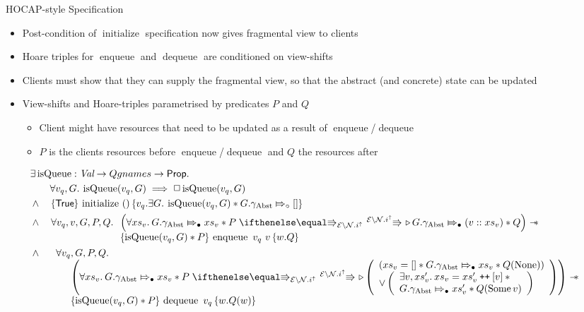 \documentclass[9pt]{beamer}
\newcommand{\initialise}{\operatorname{initialize}}
\newcommand{\enqueue}{\operatorname{enqueue}}
\newcommand{\dequeue}{\operatorname{dequeue}}
\newcommand{\isqueue}{\operatorname{isQueue}}
\newcommand{\Qgnames}{Qgnames}
\newcommand{\vq}{v_q}
\newcommand{\nodeval}{\valB}
\newcommand{\absvalue}{\val}
\newcommand{\absvalueList}{xs_v}
\newcommand{\Qg}{G}
\newcommand{\gabst}{\gname_{\mathrm{Abst}}}
\newcommand\catenate{\mathbin{\text{\ttfamily\upshape ++}}}
\newcommand{\Nl}{\ensuremath{\mathcal{N}}}
\newcommand{\abstractstatefullfrag}[2]{#1 \Mapsto_{\circ} #2}
\newcommand{\abstractstateauth}[2]{#1 \Mapsto_{\bullet} #2}
\newcommand{\hocapspecinitHTGen}[2]{\hoare{\TRUE}{\initialise \ \TT}{#1 . \Exists #2 . \isqueue(#1, #2) \star{} \abstractstatefullfrag{#2.\gabst}{[]}}}
\newcommand{\hocapspecinitGen}[2]{\hocapspecinitHTGen{#1}{#2}}
\newcommand{\hocapspecinit}{\hocapspecinitGen{\vq}{\Qg}}
\newcommand{\hocapspecenqVS}[5]{\abstractstateauth{#2.\gabst}{#5} \star{} #3 \vs[\mask\setminus\Nl.i^\uparrow] \later \abstractstateauth{#2.\gabst}{(#1 :: #5)} \star{} #4}
\newcommand{\hocapspecenqHT}[5]{\hoare{\isqueue(#1, #3) \star{} #4}{\enqueue \ #1 \ #2}{\valB . #5}}
\newcommand{\hocapspecenqGen}[6]{\All #1, #2, #3, #4, #5.
\begin{array}[t]{l}
\left(\All #6 . \hocapspecenqVS{#2}{#3}{#4}{#5}{#6} \right)
\wand\\
\hocapspecenqHT{#1}{#2}{#3}{#4}{#5}
\end{array}}
\newcommand{\hocapspecenq}{\hocapspecenqGen{\vq}{\absvalue}{\Qg}{P}{Q}{\absvalueList}}
\newcommand{\hocapspecdeqVSGen}[6]{
  \abstractstateauth{#1.\gabst}{#4} \star{} #2 \vs[\mask\setminus\Nl.i^\uparrow] \later
  \left(
    \begin{array}{l}
      (#4 = [] \star{} \abstractstateauth{#1.\gabst}{#4} \star{} #3(\None))\\
      \lor{}
      \left(
        \begin{array}{l}
          \Exists #5, #6 . #4 = #6 \catenate [#5] \star{}\\
          \abstractstateauth{#1.\gabst}{#6} \star{} #3(\Some{#5})
        \end{array}
        \right)
    \end{array}
  \right)
}
\newcommand{\hocapspecdeqVS}[4]{\hocapspecdeqVSGen{#1}{#2}{#3}{#4}{\absvalue}{#4'}}
\newcommand{\hocapspecdeqHT}[4]{\hoare{\isqueue(#1, #2) \star{} #3}{\dequeue \ #1}{\nodeval . #4(\nodeval)}}
\newcommand{\hocapspecdeqGen}[5]{\begin{array}[t]{l}
  \All #1, #2, #3, #4.\\
  \begin{array}[t]{l}
  \quad\left(\All #5 . \hocapspecdeqVS{#2}{#3}{#4}{#5} \right) \wand\\
  \quad\hocapspecdeqHT{#1}{#2}{#3}{#4}
  \end{array}
\end{array}}
\newcommand{\hocapspecdeq}{\hocapspecdeqGen{\vq}{\Qg}{P}{Q}{\absvalueList}}
\begin{document}
\begin{frame}{HOCAP-style Specification}
  \begin{itemize}
    \item Post-condition of $\initialise$ specification now gives fragmental view to clients
    \item Hoare triples for $\enqueue$ and $\dequeue$ are conditioned on view-shifts
    \item Clients must show that they can supply the fragmental view, so that the abstract (and concrete) state can be updated
    \item View-shifts and Hoare-triples parametrised by predicates $P$ and $Q$
      \begin{itemize}
        \item Client might have resources that need to be updated as a result of $\enqueue$/$\dequeue$
        \item $P$ is the clients resources before $\enqueue$/$\dequeue$ and $Q$ the resources after
      \end{itemize}
  \end{itemize}
  \begin{definition}\label{QueueSpecs:spec:hocap}
    \begin{align*}
      &\Exists \isqueue : \Val \to \Qgnames \to \Prop.\\
      &\quad\quad \All \vq, \Qg . \isqueue(\vq, \Qg) \implies \persistently \isqueue(\vq, \Qg)\\
      &\land{}\quad\hocapspecinit\\
      &\land{}\quad\hocapspecenq\\
      &\land{}\quad\hocapspecdeq
    \end{align*}
  \end{definition}
\end{frame}
\end{document}
